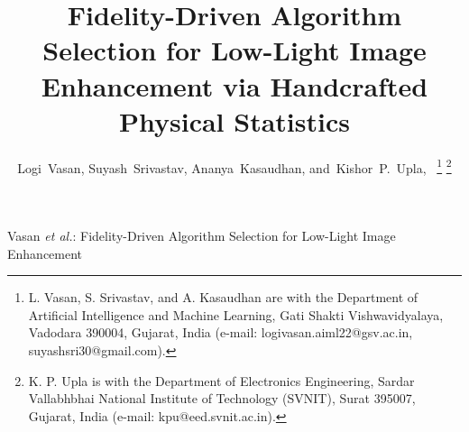 \documentclass[journal]{IEEEtran}
\begin{document}
\title{Fidelity-Driven Algorithm Selection for Low-Light Image Enhancement via Handcrafted Physical Statistics}

\author{Logi~Vasan,
        Suyash~Srivastav,
        Ananya~Kasaudhan,
        and~Kishor~P.~Upla,~%
\thanks{L. Vasan, S. Srivastav, and A. Kasaudhan are with the Department of Artificial Intelligence and Machine Learning, Gati Shakti Vishwavidyalaya, Vadodara 390004, Gujarat, India (e-mail: logivasan.aiml22@gsv.ac.in, suyashsri30@gmail.com).}%
\thanks{K. P. Upla is with the Department of Electronics Engineering, Sardar Vallabhbhai National Institute of Technology (SVNIT), Surat 395007, Gujarat, India (e-mail: kpu@eed.svnit.ac.in).}%
}

%
{Vasan \MakeLowercase{\textit{et al.}}: Fidelity-Driven Algorithm Selection for Low-Light Image Enhancement}

\maketitle
\end{document}
